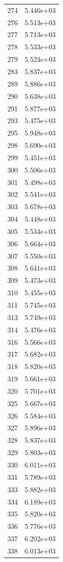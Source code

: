 \documentclass[12pt]{article}
\begin{document}
\begin{longtable}{@{}cc@{}}
274 & 5.446e+03 \\
276 & 5.513e+03 \\
277 & 5.713e+03 \\
278 & 5.533e+03 \\
279 & 5.524e+03 \\
283 & 5.837e+03 \\
289 & 5.886e+03 \\
290 & 5.638e+03 \\
291 & 5.877e+03 \\
293 & 5.475e+03 \\
295 & 5.948e+03 \\
298 & 5.690e+03 \\
299 & 5.451e+03 \\
300 & 5.506e+03 \\
301 & 5.498e+03 \\
302 & 5.541e+03 \\
303 & 5.678e+03 \\
304 & 5.448e+03 \\
305 & 5.534e+03 \\
306 & 5.664e+03 \\
307 & 5.550e+03 \\
308 & 5.641e+03 \\
309 & 5.473e+03 \\
310 & 5.455e+03 \\
311 & 5.745e+03 \\
313 & 5.749e+03 \\
314 & 5.476e+03 \\
316 & 5.566e+03 \\
317 & 5.682e+03 \\
318 & 5.820e+03 \\
319 & 5.661e+03 \\
320 & 5.701e+03 \\
325 & 5.667e+03 \\
326 & 5.584e+03 \\
327 & 5.896e+03 \\
328 & 5.837e+03 \\
329 & 5.803e+03 \\
330 & 6.011e+03 \\
331 & 5.789e+03 \\
333 & 5.882e+03 \\
334 & 6.189e+03 \\
335 & 5.820e+03 \\
336 & 5.776e+03 \\
337 & 6.202e+03 \\
338 & 6.013e+03 \\

\end{longtable}
\end{document}
